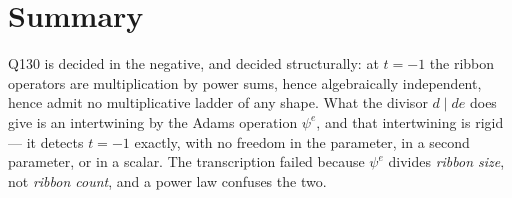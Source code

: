 \documentclass[11pt]{article}
\theoremstyle{definition}
\begin{document}
\section{Summary}

Q130 is decided in the negative, and decided structurally: at $t=-1$ the ribbon operators are
multiplication by power sums, hence algebraically independent, hence admit no multiplicative
ladder of any shape.  What the divisor $d\mid de$ does give is an intertwining by the Adams
operation $\psi^{e}$, and that intertwining is rigid --- it detects $t=-1$ exactly, with no
freedom in the parameter, in a second parameter, or in a scalar.  The transcription failed
because $\psi^{e}$ divides \emph{ribbon size}, not \emph{ribbon count}, and a power law
confuses the two.
\end{document}
